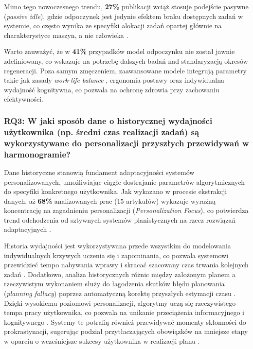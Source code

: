 \indent Mimo tego nowoczesnego trendu, \textbf{27\%} publikacji wciąż stosuje podejście pasywne (\textit{passive idle}), gdzie odpoczynek jest jedynie efektem braku dostępnych zadań w systemie, co często wynika ze specyfiki alokacji zadań opartej głównie na charakterystyce maszyn, a nie człowieka \cite{HRC2020, hierarchy2024}. 

\indent Warto zauważyć, że w \textbf{41\%} przypadków model odpoczynku nie został jawnie zdefiniowany, co wskazuje na potrzebę dalszych badań nad standaryzacją okresów regeneracji. Poza samym zmęczeniem, zaawansowane modele integrują parametry takie jak zasady \textit{work-life balance} \cite{workLifeBalance2023}, ergonomia postawy \cite{TaskAllocation2024} oraz indywidualna wydajność kognitywna, co pozwala na ochronę zdrowia przy zachowaniu efektywności.

\subsubsection{RQ3: W jaki sposób dane o historycznej wydajności użytkownika (np. średni czas realizacji zadań) są wykorzystywane do personalizacji przyszłych przewidywań w harmonogramie?}
\quad Dane historyczne stanowią fundament adaptacyjności systemów personalizowanych, umożliwiając ciągłe dostrajanie parametrów algorytmicznych do specyfiki konkretnego użytkownika. Jak wykazano w procesie ekstrakcji danych, aż \textbf{68\%} analizowanych prac (15 artykułów) wykazuje wyraźną koncentrację na zagadnieniu personalizacji (\textit{Personalization Focus}), co potwierdza trend odchodzenia od sztywnych systemów planistycznych na rzecz rozwiązań adaptacyjnych \cite{JSHM2026, bayesian2024}.

\indent Historia wydajności jest wykorzystywana przede wszystkim do modelowania indywidualnych krzywych uczenia się i zapominania, co pozwala systemowi przewidzieć tempo nabywania wprawy i skracać szacowany czas trwania kolejnych zadań \cite{competenceTimeQuality2020}. Dodatkowo, analiza historycznych różnic między założonym planem a rzeczywistym wykonaniem służy do łagodzenia skutków błędu planowania (\textit{planning fallacy}) poprzez automatyczną korektę przyszłych estymacji czasu \cite{gap2024}. Dzięki wysokiemu poziomowi personalizacji, algorytmy uczą się rzeczywistego tempa pracy użytkownika, co pozwala na unikanie przeciążenia informacyjnego i kognitywnego \cite{orchestration2026, inTimeRL2021}. Systemy te potrafią również przewidywać momenty skłonności do prokrastynacji, sugerując podział przytłaczających obowiązków na mniejsze etapy w oparciu o wcześniejsze sukcesy użytkownika w realizacji planu \cite{education2022}.


